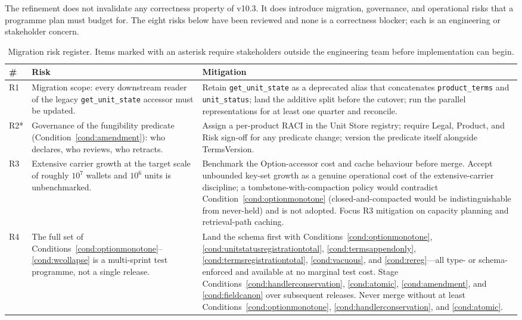 \documentclass[11pt,a4paper]{article}
\begin{document}
The refinement does not invalidate any correctness property of v10.3. It does introduce migration, governance, and operational risks that a programme plan must budget for. The eight risks below have been reviewed and none is a correctness blocker; each is an engineering or stakeholder concern.

\begin{longtable}{p{0.8cm}p{6.2cm}p{7.8cm}}
\caption{Migration risk register. Items marked with an asterisk require stakeholders outside the engineering team before implementation can begin.}\\
\toprule
\textbf{\#} & \textbf{Risk} & \textbf{Mitigation} \\
\midrule
R1 & Migration scope: every downstream reader of the legacy \texttt{get\_unit\_state} accessor must be updated. & Retain \texttt{get\_unit\_state} as a deprecated alias that concatenates \texttt{product\_terms} and \texttt{unit\_status}; land the additive split before the cutover; run the parallel representations for at least one quarter and reconcile. \\
\addlinespace
R2* & Governance of the fungibility predicate (Condition~\ref{cond:amendment}): who declares, who reviews, who retracts. & Assign a per-product RACI in the Unit Store registry; require Legal, Product, and Risk sign-off for any predicate change; version the predicate itself alongside TermsVersion. \\
\addlinespace
R3 & Extensive carrier growth at the target scale of roughly $10^7$ wallets and $10^6$ units is unbenchmarked. & Benchmark the Option-accessor cost and cache behaviour before merge. Accept unbounded key-set growth as a genuine operational cost of the extensive-carrier discipline; a tombstone-with-compaction policy would contradict Condition~\ref{cond:optionmonotone} (closed-and-compacted would be indistinguishable from never-held) and is not adopted. Focus R3 mitigation on capacity planning and retrieval-path caching. \\
\addlinespace
R4 & The full set of Conditions~\ref{cond:optionmonotone}--\ref{cond:wcollapse} is a multi-sprint test programme, not a single release. & Land the schema first with Conditions~\ref{cond:optionmonotone}, \ref{cond:unitstatusregistrationtotal}, \ref{cond:termsappendonly}, \ref{cond:termsregistrationtotal}, \ref{cond:vacuous}, and \ref{cond:rereg}---all type- or schema-enforced and available at no marginal test cost. Stage Conditions~\ref{cond:handlerconservation}, \ref{cond:atomic}, \ref{cond:amendment}, and \ref{cond:fieldcanon} over subsequent releases. Never merge without at least Conditions~\ref{cond:optionmonotone}, \ref{cond:handlerconservation}, and \ref{cond:atomic}. \\

\end{longtable}
\end{document}
